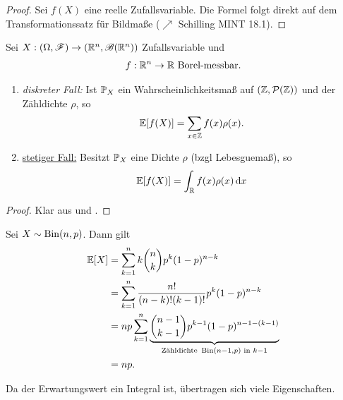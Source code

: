 \begin{proof}
	Sei $f(X)$ eine reelle Zufallsvariable. Die Formel folgt direkt auf dem Transformationssatz für Bildmaße ($\nearrow$ Schilling MINT 18.1).
\end{proof}
\begin{proposition}
	Sei $X: (\O, \F) \to (\Rn, \borel(\Rn))$ Zufallsvariable und
	\begin{align*}
		f: \Rn \to \R \text{ Borel-messbar}.
	\end{align*}
	\begin{enumerate}
		\item \emph{diskreter Fall:} Ist $\P_X$ ein Wahrscheinlichkeitsmaß auf $(\Z, \pows(\Z))$ und der Zähldichte $\rho$, so
		\begin{align*}
			\E[f(X)] = \sum_{x \in \Z} f(x)\rho(x).
		\end{align*}
		\item \ul{stetiger Fall:} Besitzt $\P_X$ eine Dichte $\rho$ (bzgl Lebesguemaß), so
		\begin{align*}
			\E[f(X)] = \int_{\R} f(x)\rho(x) \d x
		\end{align*}
	\end{enumerate}
\end{proposition}
\begin{proof}
	Klar aus  und .
\end{proof}
\begin{example}
	Sei $X \sim \Bin(n,p)$. Dann gilt
	\begin{align*}
		\E[X] &= \sum_{k=1}^n k\binom{n}{k}p^k (1-p)^{n-k}\\
		&= \sum_{k=1}^n \frac{n!}{(n-k)!(k-1)!}p^k (1-p)^{n-k}\\
		&= np \sum_{k=1}^n \underbrace{\binom{n-1}{k-1}p^{k-1}(1-p)^{n-1-(k-1)}}_{\text{Zähldichte }\Bin(n-1,p) \text{ in } k-1}\\
		&= np.
	\end{align*}
\end{example}
Da der Erwartungswert ein Integral ist, übertragen sich viele Eigenschaften. 
